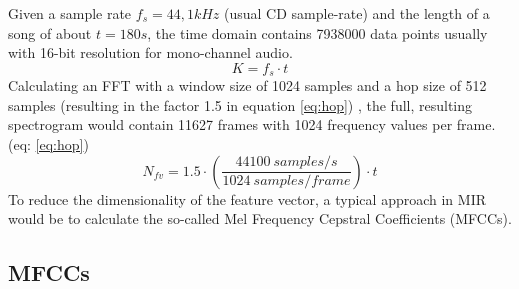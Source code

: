 Given a sample rate $f_s = 44,1kHz$ (usual CD sample-rate) and the length of a song of about $t = 180s$, the time domain contains 7938000 data points usually with 16-bit resolution for mono-channel audio. 
\begin{equation} \label{eq:points}
K = f_s \cdot t
\end{equation}
Calculating an FFT with a window size of 1024 samples and a hop size of 512 samples (resulting in the factor 1.5 in equation \ref{eq:hop}) \cite[p. 41]{knees1}, the full, resulting spectrogram would contain 11627 frames with 1024 frequency values per frame. (eq: \ref{eq:hop}) 
\begin{equation} \label{eq:hop}
N_{fv} = 1.5 \cdot (\frac{44100 \ samples/s}{1024 \ samples/frame}) \cdot t
\end{equation}
To reduce the dimensionality of the feature vector, a typical approach in MIR would be to calculate the so-called Mel Frequency Cepstral Coefficients (MFCCs).

\subsection{MFCCs}\label{mfccsim}

